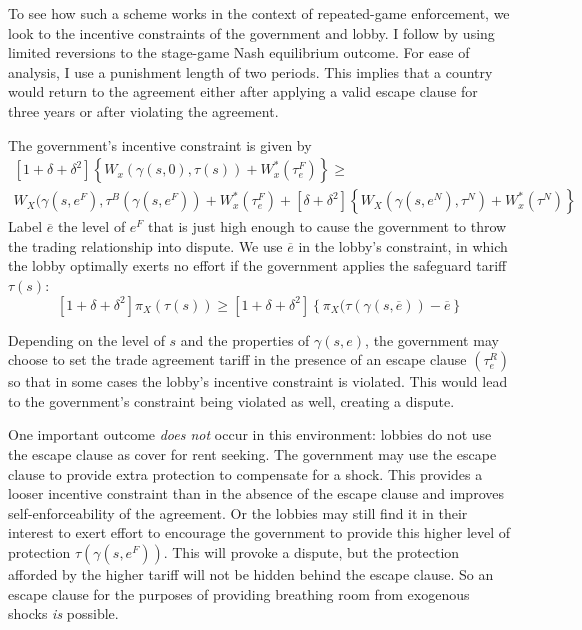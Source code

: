 \documentclass[12pt]{article}
\newcommand{\ov}{\overline}
\newcommand{\ga}{\gamma}
\newcommand{\de}{\delta}
\begin{document}
To see how such a scheme works in the context of repeated-game enforcement, we look to the incentive constraints of the government and lobby. I follow \Textcite{buzard2013a} by using limited reversions to the stage-game Nash equilibrium outcome. For ease of analysis, I use a punishment length of two periods. This implies that a country would return to the agreement either after applying a valid escape clause for three years or after violating the agreement.

The government's incentive constraint is given by
  \begin{multline}
    \left[1+ \de +\de^2 \right] \left\{W_x(\ga(s,0),\tau(s)) + W_x^*(\tau_e^F) \right\} \geq \\ W_X(\ga(s,e^F),\tau^B(\ga(s,e^F)) + W_x^*(\tau_e^F) + \left[\de +\de^2 \right] \left\{W_X(\ga(s,e^N),\tau^N) + W_x^*(\tau^N) \right\}
		\label{exp:govincentEC}
  \end{multline}
Label $\ov{e}$ the level of $e^F$ that is just high enough to cause the government to throw the trading relationship into dispute. We use $\ov{e}$ in the lobby's constraint, in which the lobby optimally exerts no effort if the government applies the safeguard tariff $\tau(s)$:
\begin{equation}
  \left[1+ \de +\de^2 \right] \pi_X(\tau(s)) \geq \left[1+ \de +\de^2 \right] \left\{\pi_X(\tau(\ga(s,\ov{e})) - \ov{e} \right\}
	\label{exp:lobbyEC}
\end{equation}

Depending on the level of $s$ and the properties of $\ga(s,e)$, the government may choose to set the trade agreement tariff in the presence of an escape clause $\left(\tau_e^R\right)$ so that in some cases the lobby's incentive constraint is violated. This would lead to the government's constraint being violated as well, creating a dispute. 

One important outcome \textit{does not} occur in this environment: lobbies do not use the escape clause as cover for rent seeking. The government may use the escape clause to provide extra protection to compensate for a shock. This provides a looser incentive constraint than in the absence of the escape clause and improves self-enforceability of the agreement. Or the lobbies may still find it in their interest to exert effort to encourage the government to provide this higher level of protection $\tau(\ga(s,e^F))$. This will provoke a dispute, but the protection afforded by the higher tariff will not be hidden behind the escape clause. So an escape clause for the purposes of providing breathing room from exogenous shocks \textit{is} possible.
\end{document}
